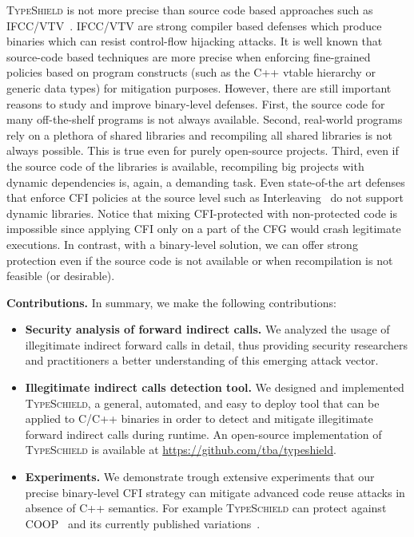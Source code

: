 \textsc{TypeShield} is not more precise than source code based
approaches such as IFCC/VTV~\cite{vtv:tice}.
IFCC/VTV are strong compiler based defenses which produce binaries which can resist control-flow
hijacking attacks. It is well known that source-code based techniques are more precise 
when enforcing fine-grained policies based on program constructs (such as
the C++ vtable hierarchy or generic data types) for mitigation
purposes. However, there are still important reasons to study
and improve binary-level defenses. First, the source code
for many off-the-shelf programs is not always available.
Second, real-world programs rely on a plethora of shared
libraries and recompiling all shared libraries is not always
possible. This is true even for purely open-source projects.
Third, even if the source code of the libraries is
available, recompiling big projects with dynamic dependencies is, 
again, a demanding task. Even state-of-the art
defenses that enforce CFI policies at the source level such
as Interleaving~\cite{bounov:interleaving} do not support dynamic libraries.
Notice that mixing CFI-protected with non-protected code is impossible since
applying CFI only on a part of the CFG would crash legitimate executions.
In contrast, with a binary-level solution, we
can offer strong protection even if the source code is not
available or when recompilation is not feasible (or desirable).

\textbf{Contributions.} In summary, we make the following contributions:
\label{Contribution}
\begin{itemize}
 \item \textbf{Security analysis of forward indirect calls.} 
 We analyzed the usage of illegitimate indirect forward calls in detail,
 thus providing security researchers and
practitioners a better understanding of this emerging
attack vector.

 \item \textbf{Illegitimate indirect calls detection tool.}
 We designed and implemented \textsc{TypeSchield}, a general, automated, and easy to deploy tool
 that can be applied to C/C++ binaries in order to detect and mitigate illegitimate forward indirect calls 
 during runtime. An open-source implementation of \textsc{TypeSchield} is available at \url{https://github.com/tba/typeshield}.
 
 \item \textbf{Experiments.} We demonstrate trough extensive experiments that our precise
 binary-level CFI strategy can mitigate advanced code reuse attacks in absence of C++ semantics.
 For example \textsc{TypeSchield} can protect against COOP~\cite{schuster:coop} and its currently published 
 variations~\cite{ctf:coop, crane:readactor++, loop:oriented, subversive-c:lettner}.
  
\end{itemize}

